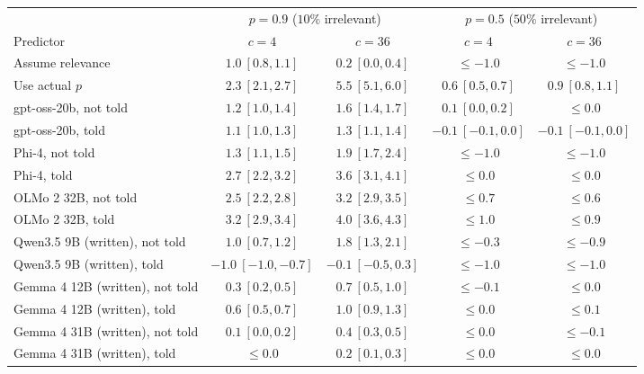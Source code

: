 \begingroup
\fontsize{9}{11}\selectfont
\setlength{\tabcolsep}{4pt}
\renewcommand{\arraystretch}{1.08}
\begin{tabular}{@{}lcccc@{}}
\toprule
& \multicolumn{2}{c}{$p=0.9$ ($10\%$ irrelevant)}
& \multicolumn{2}{c}{$p=0.5$ ($50\%$ irrelevant)} \\
\cmidrule(lr){2-3}\cmidrule(lr){4-5}
Predictor & $c=4$ & $c=36$ & $c=4$ & $c=36$ \\
\midrule
Assume relevance & $1.0\ [0.8,1.1]$ & $0.2\ [0.0,0.4]$ & $\le-1.0$ & $\le-1.0$ \\
Use actual $p$ & $2.3\ [2.1,2.7]$ & $5.5\ [5.1,6.0]$ & $0.6\ [0.5,0.7]$ & $0.9\ [0.8,1.1]$ \\
\addlinespace[3pt]
gpt-oss-20b, not told & $1.2\ [1.0,1.4]$ & $1.6\ [1.4,1.7]$ & $0.1\ [0.0,0.2]$ & $\le0.0$ \\
gpt-oss-20b, told & $1.1\ [1.0,1.3]$ & $1.3\ [1.1,1.4]$ & $-0.1\ [-0.1,0.0]$ & $-0.1\ [-0.1,0.0]$ \\
Phi-4, not told & $1.3\ [1.1,1.5]$ & $1.9\ [1.7,2.4]$ & $\le-1.0$ & $\le-1.0$ \\
Phi-4, told & $2.7\ [2.2,3.2]$ & $3.6\ [3.1,4.1]$ & $\le0.0$ & $\le0.0$ \\
OLMo 2 32B, not told & $2.5\ [2.2,2.8]$ & $3.2\ [2.9,3.5]$ & $\le0.7$ & $\le0.6$ \\
OLMo 2 32B, told & $3.2\ [2.9,3.4]$ & $4.0\ [3.6,4.3]$ & $\le1.0$ & $\le0.9$ \\
Qwen3.5 9B (written), not told & $1.0\ [0.7,1.2]$ & $1.8\ [1.3,2.1]$ & $\le-0.3$ & $\le-0.9$ \\
Qwen3.5 9B (written), told & $-1.0\ [-1.0,-0.7]$ & $-0.1\ [-0.5,0.3]$ & $\le-1.0$ & $\le-1.0$ \\
Gemma 4 12B (written), not told & $0.3\ [0.2,0.5]$ & $0.7\ [0.5,1.0]$ & $\le-0.1$ & $\le0.0$ \\
Gemma 4 12B (written), told & $0.6\ [0.5,0.7]$ & $1.0\ [0.9,1.3]$ & $\le0.0$ & $\le0.1$ \\
Gemma 4 31B (written), not told & $0.1\ [0.0,0.2]$ & $0.4\ [0.3,0.5]$ & $\le0.0$ & $\le-0.1$ \\
Gemma 4 31B (written), told & $\le0.0$ & $0.2\ [0.1,0.3]$ & $\le0.0$ & $\le0.0$ \\
\bottomrule
\end{tabular}
\endgroup
